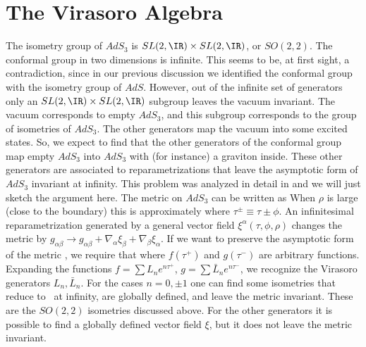 


\section{The Virasoro Algebra}

The  isometry group  of $AdS_3$ is $SL(2,\IR) \times SL(2,\IR)$, or
$SO(2,2)$. 
The conformal group in two dimensions is infinite.  
This seems to be, at first sight, a 
contradiction, since in our previous discussion we identified the
conformal group with the isometry group of $AdS$. 
However, out of the infinite set of generators 
only an $SL(2,\IR)\times SL(2,\IR)$ subgroup leaves the vacuum invariant.
The vacuum corresponds to empty $AdS_3$, and this
 subgroup corresponds to the group of isometries of $AdS_3$.
 The other generators map the vacuum into some
excited states. So, we expect to find that the other generators of the
conformal group map empty $AdS_3$ into $AdS_3$ with (for instance)
a graviton inside.
These other generators are associated to reparametrizations that
leave the asymptotic form of $AdS_3 $ invariant at infinity. 
This problem was analyzed in detail in \cite{Brown:1986nw}
and we will
just sketch the argument here. 
The metric on $AdS_3$ can be
written as
When $\rho$ is large (close to the boundary) this is approximately 
where $\tau^\pm \equiv \tau \pm \phi$. 
An infinitesimal reparametrization
generated by a 
 general vector field $\xi^\alpha (\tau,\phi,\rho)$ changes the metric
by $ g_{\alpha \beta} \to  g_{\alpha \beta} + \nabla_\alpha \xi_\beta
+ \nabla_\beta \xi_\alpha $. 
If we want to preserve the asymptotic form of the metric \metasym, 
we require that \cite{Brown:1986nw}
where $f(\tau^+)$ and $g(\tau^-)$ are arbitrary functions.
Expanding the functions $f = \sum L_n e^{n \tau^+ } $, $g = 
\sum {\bar L}_n e^{ n \tau^- } $, we recognize the
Virasoro generators $L_n, \bar L_{n}$. 
For the cases $n =0,\pm1$ one can find some isometries that
reduce to \asymp\ at infinity, are globally defined, and 
leave the metric invariant. These are the $SO(2,2)$ isometries
discussed above. For the other generators it is possible to 
find a globally defined vector field $\xi$, but it does not 
leave the metric invariant. 

